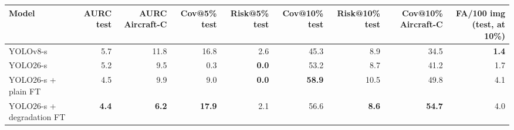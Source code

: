 \begin{tabular}{lrrrrrrrr}
\toprule
Model & AURC test & AURC Aircraft-C & Cov@5\% test & Risk@5\% test & Cov@10\% test & Risk@10\% test & Cov@10\% Aircraft-C & FA/100 img (test, at 10\%) \\
\midrule
YOLOv8-s & 5.7 & 11.8 & 16.8 & 2.6 & 45.3 & 8.9 & 34.5 & \textbf{1.4} \\
YOLO26-s & 5.2 & 9.5 & 0.3 & \textbf{0.0} & 53.2 & 8.7 & 41.2 & 1.7 \\
YOLO26-s + plain FT & 4.5 & 9.9 & 9.0 & \textbf{0.0} & \textbf{58.9} & 10.5 & 49.8 & 4.1 \\
YOLO26-s + degradation FT & \textbf{4.4} & \textbf{6.2} & \textbf{17.9} & 2.1 & 56.6 & \textbf{8.6} & \textbf{54.7} & 4.0 \\
\bottomrule
\end{tabular}
